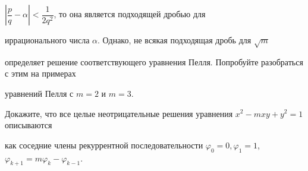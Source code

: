 \documentclass[a4paper,12pt]{article}
\begin{document}
$\left|\dfrac{p}{q}-\alpha\right|<\dfrac{1}{2q^2}$, то она является подходящей дробью для

иррационального числа $\alpha$. Однако, не всякая подходящая дробь для $\sqrt{m}$

определяет решение соответствующего уравнения Пелля. Попробуйте разобраться с этим на примерах

уравнений Пелля с $m=2$ и $m=3$.



 Докажите, что все целые неотрицательные решения  уравнения $x^2-mxy+y^2=1$ описываются

как соседние члены рекуррентной последовательности $\varphi_0=0,\varphi_1=1$, $\varphi_{k+1}=

m\varphi_k-\varphi_{k-1}$.




















\end{document}
